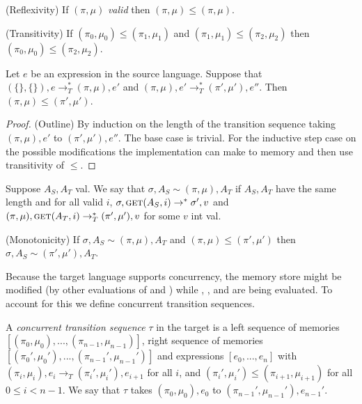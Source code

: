 \begin{lemma}
(Reflexivity) If $(\pi, \mu)$ \emph{valid} then $(\pi, \mu) \leq (\pi, \mu)$. 
\end{lemma}

\begin{lemma}
(Transitivity) If $(\pi_0, \mu_0) \leq (\pi_1, \mu_1)$ and $(\pi_1, \mu_1) \leq (\pi_2, \mu_2)$ then $(\pi_0, \mu_0) \leq (\pi_2, \mu_2)$.
\end{lemma}

\begin{theorem}
Let $e$ be an expression in the source language. Suppose that $(\{\}, \{\}), e \to^*_T (\pi, \mu), e'$ and $(\pi, \mu), e' \to^*_T (\pi', \mu'), e''$. Then $(\pi, \mu) \leq (\pi', \mu')$.
\end{theorem}

\begin{proof}
(Outline) By induction on the length of the transition sequence taking $(\pi, \mu), e'$ to $(\pi', \mu'), e''$. The base case is trivial. For the inductive step case on the possible modifications the implementation can make to memory and then use transitivity of $\leq$.
\end{proof}

\begin{definition}
Suppose $A_S, A_T$ val. We say that $\sigma, A_S \sim (\pi, \mu), A_T$ if $A_S, A_T$ have the same length and for all valid $i$, $\sigma, \text{{\sc get}}{}(A_S, i) \to^* \sigma', v$ and $(\pi, \mu), \text{{\sc get}}{}(A_T, i) \to^*_T (\pi', \mu'), v$ for some $v$ int val.
\end{definition}

\begin{lemma}
\label{preservation-lemma}
(Monotonicity) If $\sigma, A_S \sim (\pi, \mu), A_T$ and $(\pi, \mu) \leq (\pi', \mu')$ then $\sigma, A_S \sim (\pi', \mu'), A_T$.
\end{lemma}

Because the target language supports concurrency, the memory store might be modified (by other evaluations of \new{} and \set{}) while \new{}, \get{}, and \set{} are being evaluated. To account for this we define concurrent transition sequences.

\begin{definition}
A \emph{concurrent transition sequence} $\tau$ in the target is a left sequence of memories $[(\pi_0,\mu_0), ..., (\pi_{n-1},\mu_{n-1})]$, right sequence of memories $[(\pi_0',\mu_0'), ..., (\pi_{n-1}',\mu_{n-1}')]$ and expressions $[e_0, ..., e_n]$ with $(\pi_i,\mu_i), e_i \to_T (\pi_i',\mu_i'), e_{i+1}$ for all $i$, and $(\pi_i', \mu_i') \leq (\pi_{i+1}, \mu_{i+1})$ for all $0 \leq i < n-1$. We say that $\tau$ takes $(\pi_0, \mu_0), e_0$ to $(\pi_{n-1}',\mu_{n-1}'), e_{n-1}'$.
\end{definition}

